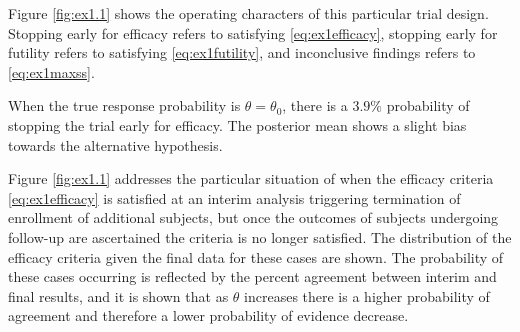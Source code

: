 \documentclass[12pt]{article}
\begin{document}
Figure \ref{fig:ex1.1} shows the operating characters of this particular trial design. Stopping early for efficacy refers to satisfying \eqref{eq:ex1efficacy}, stopping early for futility refers to satisfying \eqref{eq:ex1futility}, and inconclusive findings refers to \eqref{eq:ex1maxss}. 

When the true response probability is $\theta=\theta_0$, there is a $3.9\%$ probability of stopping the trial early for efficacy. The posterior mean shows a slight bias towards the alternative hypothesis.

Figure \ref{fig:ex1.1} addresses the particular situation of when the efficacy criteria \eqref{eq:ex1efficacy} is satisfied at an interim analysis triggering termination of enrollment of additional subjects, but once the outcomes of subjects undergoing follow-up are ascertained the criteria is no longer satisfied. The distribution of the efficacy criteria given the final data for these cases are shown. The probability of these cases occurring is reflected by the percent agreement between interim and final results, and it is shown that as $\theta$ increases there is a higher probability of agreement and therefore a lower probability of evidence decrease.
\end{document}
